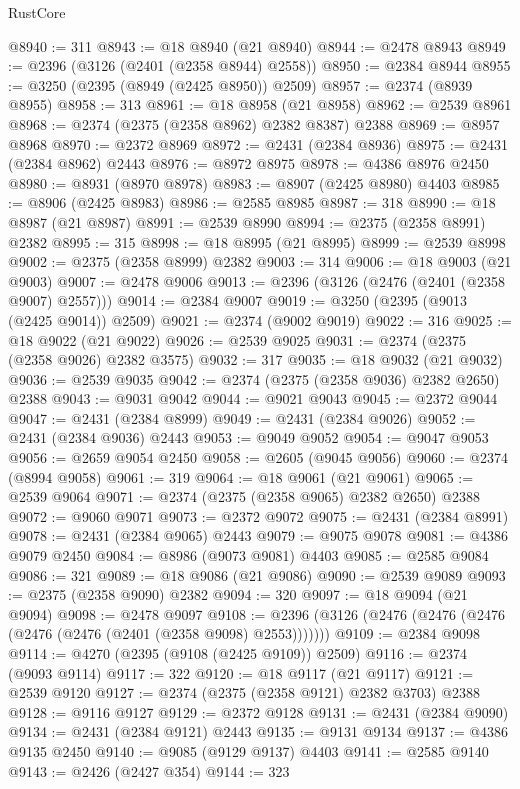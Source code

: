 \begin{lexlean}{RustCore}
\begin{coremodule}
@8940 := 311
@8943 := @18 @8940 (@21 @8940)
@8944 := @2478 @8943
@8949 := @2396 (@3126 (@2401 (@2358 @8944) @2558))
@8950 := @2384 @8944
@8955 := @3250 (@2395 (@8949 (@2425 @8950)) @2509)
@8957 := @2374 (@8939 @8955)
@8958 := 313
@8961 := @18 @8958 (@21 @8958)
@8962 := @2539 @8961
@8968 := @2374 (@2375 (@2358 @8962) @2382 @8387) @2388
@8969 := @8957 @8968
@8970 := @2372 @8969
@8972 := @2431 (@2384 @8936)
@8975 := @2431 (@2384 @8962) @2443
@8976 := @8972 @8975
@8978 := @4386 @8976 @2450
@8980 := @8931 (@8970 @8978)
@8983 := @8907 (@2425 @8980) @4403
@8985 := @8906 (@2425 @8983)
@8986 := @2585 @8985
@8987 := 318
@8990 := @18 @8987 (@21 @8987)
@8991 := @2539 @8990
@8994 := @2375 (@2358 @8991) @2382
@8995 := 315
@8998 := @18 @8995 (@21 @8995)
@8999 := @2539 @8998
@9002 := @2375 (@2358 @8999) @2382
@9003 := 314
@9006 := @18 @9003 (@21 @9003)
@9007 := @2478 @9006
@9013 := @2396 (@3126 (@2476 (@2401 (@2358 @9007) @2557)))
@9014 := @2384 @9007
@9019 := @3250 (@2395 (@9013 (@2425 @9014)) @2509)
@9021 := @2374 (@9002 @9019)
@9022 := 316
@9025 := @18 @9022 (@21 @9022)
@9026 := @2539 @9025
@9031 := @2374 (@2375 (@2358 @9026) @2382 @3575)
@9032 := 317
@9035 := @18 @9032 (@21 @9032)
@9036 := @2539 @9035
@9042 := @2374 (@2375 (@2358 @9036) @2382 @2650) @2388
@9043 := @9031 @9042
@9044 := @9021 @9043
@9045 := @2372 @9044
@9047 := @2431 (@2384 @8999)
@9049 := @2431 (@2384 @9026)
@9052 := @2431 (@2384 @9036) @2443
@9053 := @9049 @9052
@9054 := @9047 @9053
@9056 := @2659 @9054 @2450
@9058 := @2605 (@9045 @9056)
@9060 := @2374 (@8994 @9058)
@9061 := 319
@9064 := @18 @9061 (@21 @9061)
@9065 := @2539 @9064
@9071 := @2374 (@2375 (@2358 @9065) @2382 @2650) @2388
@9072 := @9060 @9071
@9073 := @2372 @9072
@9075 := @2431 (@2384 @8991)
@9078 := @2431 (@2384 @9065) @2443
@9079 := @9075 @9078
@9081 := @4386 @9079 @2450
@9084 := @8986 (@9073 @9081) @4403
@9085 := @2585 @9084
@9086 := 321
@9089 := @18 @9086 (@21 @9086)
@9090 := @2539 @9089
@9093 := @2375 (@2358 @9090) @2382
@9094 := 320
@9097 := @18 @9094 (@21 @9094)
@9098 := @2478 @9097
@9108 := @2396 (@3126 (@2476 (@2476 (@2476 (@2476 (@2476 (@2401 (@2358 @9098) @2553)))))))
@9109 := @2384 @9098
@9114 := @4270 (@2395 (@9108 (@2425 @9109)) @2509)
@9116 := @2374 (@9093 @9114)
@9117 := 322
@9120 := @18 @9117 (@21 @9117)
@9121 := @2539 @9120
@9127 := @2374 (@2375 (@2358 @9121) @2382 @3703) @2388
@9128 := @9116 @9127
@9129 := @2372 @9128
@9131 := @2431 (@2384 @9090)
@9134 := @2431 (@2384 @9121) @2443
@9135 := @9131 @9134
@9137 := @4386 @9135 @2450
@9140 := @9085 (@9129 @9137) @4403
@9141 := @2585 @9140
@9143 := @2426 (@2427 @354)
@9144 := 323

\end{coremodule}
\end{lexlean}
